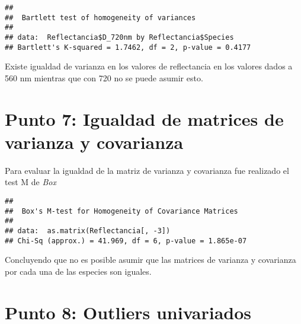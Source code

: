 \documentclass[
]{article}
\newenvironment{Shaded}{\begin{snugshade}}{\end{snugshade}}
\newcommand{\DecValTok}[1]{\textcolor[rgb]{0.00,0.00,0.81}{#1}}
\newcommand{\KeywordTok}[1]{\textcolor[rgb]{0.13,0.29,0.53}{\textbf{#1}}}
\newcommand{\NormalTok}[1]{#1}
\newcommand{\OperatorTok}[1]{\textcolor[rgb]{0.81,0.36,0.00}{\textbf{#1}}}
\newcommand{\StringTok}[1]{\textcolor[rgb]{0.31,0.60,0.02}{#1}}
\begin{document}
\begin{Shaded}
\end{Shaded}

\begin{verbatim}
## 
##  Bartlett test of homogeneity of variances
## 
## data:  Reflectancia$D_720nm by Reflectancia$Species
## Bartlett's K-squared = 1.7462, df = 2, p-value = 0.4177
\end{verbatim}

Existe igualdad de varianza en los valores de reflectancia en los
valores dados a 560 nm mientras que con 720 no se puede asumir esto.

\hypertarget{punto-7-igualdad-de-matrices-de-varianza-y-covarianza}{%
\section{Punto 7: Igualdad de matrices de varianza y
covarianza}\label{punto-7-igualdad-de-matrices-de-varianza-y-covarianza}}

Para evaluar la igualdad de la matriz de varianza y covarianza fue
realizado el test M de \emph{Box}

\begin{Shaded}
\end{Shaded}

\begin{verbatim}
## 
##  Box's M-test for Homogeneity of Covariance Matrices
## 
## data:  as.matrix(Reflectancia[, -3])
## Chi-Sq (approx.) = 41.969, df = 6, p-value = 1.865e-07
\end{verbatim}

Concluyendo que no es posible asumir que las matrices de varianza y
covarianza por cada una de las especies son iguales.

\hypertarget{punto-8-outliers-univariados}{%
\section{Punto 8: Outliers
univariados}\label{punto-8-outliers-univariados}}
\end{document}
